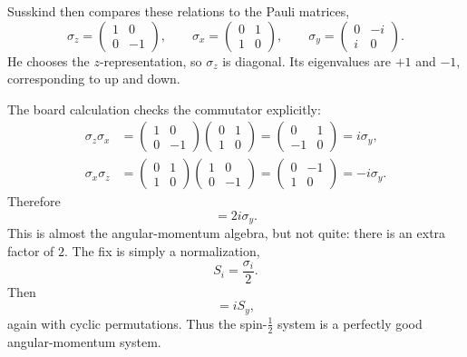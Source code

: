Susskind then compares these relations to the Pauli matrices,
\begin{equation}
\sigma_{z}=
\begin{pmatrix}
1&0\\
0&-1
\end{pmatrix},
\qquad
\sigma_{x}=
\begin{pmatrix}
0&1\\
1&0
\end{pmatrix},
\qquad
\sigma_{y}=
\begin{pmatrix}
0&-i\\
i&0
\end{pmatrix}.
\end{equation}
He chooses the \(z\)-representation, so \(\sigma_{z}\) is diagonal. Its eigenvalues are \(+1\) and \(-1\), corresponding to up and down.

The board calculation checks the commutator explicitly:
\begin{align}
\sigma_{z}\sigma_{x}
&=
\begin{pmatrix}
1&0\\
0&-1
\end{pmatrix}
\begin{pmatrix}
0&1\\
1&0
\end{pmatrix}
=
\begin{pmatrix}
0&1\\
-1&0
\end{pmatrix}
=
i\sigma_{y},\\
\sigma_{x}\sigma_{z}
&=
\begin{pmatrix}
0&1\\
1&0
\end{pmatrix}
\begin{pmatrix}
1&0\\
0&-1
\end{pmatrix}
=
\begin{pmatrix}
0&-1\\
1&0
\end{pmatrix}
=
-i\sigma_{y}.
\end{align}
Therefore
\begin{equation}
[\sigma_{z},\sigma_{x}]=2i\sigma_{y}.
\end{equation}
This is almost the angular-momentum algebra, but not quite: there is an extra factor of \(2\). The fix is simply a normalization,
\begin{equation}
S_{i}=\frac{\sigma_{i}}{2}.
\end{equation}
Then
\begin{equation}
[S_{z},S_{x}]=iS_{y},
\end{equation}
again with cyclic permutations. Thus the spin-\(\tfrac{1}{2}\) system is a perfectly good angular-momentum system.

